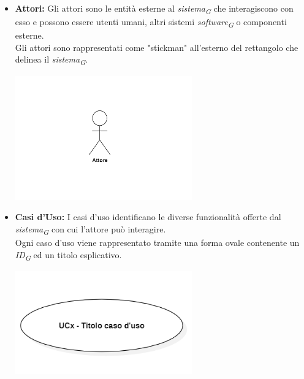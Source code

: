 \begin{itemize}
    \item \textbf{Attori:}
    Gli attori sono le entità esterne al \textit{sistema}\textsubscript{\textit{G}} che interagiscono con esso e possono essere utenti umani, altri sistemi \textit{software}\textsubscript{\textit{G}} o componenti esterne. \\
    Gli attori sono rappresentati come "stickman" all'esterno del rettangolo che delinea il \textit{sistema}\textsubscript{\textit{G}}.
    \begin{minipage}[t]{\linewidth}
        \centering
        \includegraphics[width=0.6\textwidth]{../Images/NormeDiProgetto/Attore.PNG}
    \end{minipage}

    \item \textbf{Casi d'Uso:}
    I casi d'uso identificano le diverse funzionalità offerte dal \textit{sistema}\textsubscript{\textit{G}} con cui l'attore può interagire. \\
    Ogni caso d'uso viene rappresentato tramite una forma ovale contenente un \textit{ID}\textsubscript{\textit{G}} ed un titolo esplicativo.
    \begin{minipage}[t]{\linewidth}
        \centering
        \includegraphics[width=0.6\textwidth]{../Images/NormeDiProgetto/UC.PNG}
    \end{minipage}


\end{itemize}

